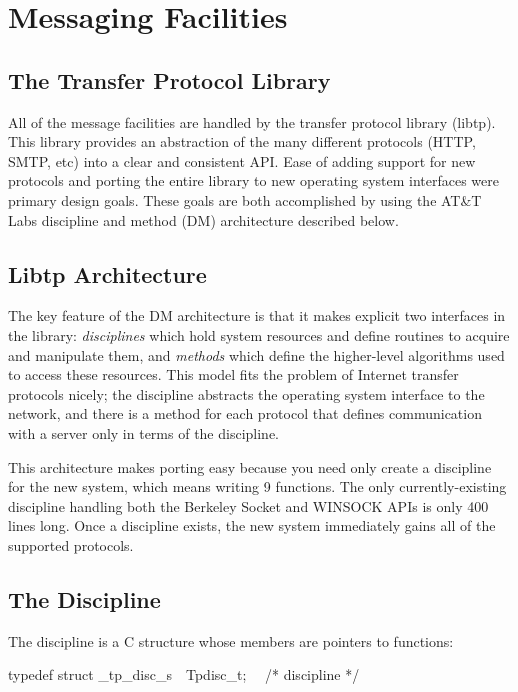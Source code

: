 \section{Messaging Facilities}
\subsection{The Transfer
Protocol Library}

All of the message facilities are handled by the transfer protocol
library (libtp). This library provides an abstraction of the many
different protocols (HTTP, SMTP, etc) into a clear and consistent
API. Ease of adding support for new protocols and porting the entire
library to new operating system interfaces were primary design
goals. These goals are both accomplished by using the AT\&T Labs
discipline and method (DM) architecture described below.

\subsection{Libtp Architecture}

The key feature of the DM architecture is that it makes explicit two
interfaces in the library: \textit{disciplines} which hold system
resources and define routines to acquire and manipulate them, and
\textit{methods} which define the higher-level algorithms used to
access these resources. This model fits the problem of Internet
transfer protocols nicely; the discipline abstracts the operating
system interface to the network, and there is a method for each
protocol that defines communication with a server only in terms of the
discipline.

This architecture makes porting easy because you need only create a
discipline for the new system, which means writing 9 functions. The
only currently-existing discipline handling both the Berkeley Socket
and WINSOCK APIs is only 400 lines long. Once a discipline exists, the
new system immediately gains all of the supported protocols.

\subsection{The Discipline}

The discipline is a C structure whose members are pointers to functions:

\bigskip

{\ttfamily\mdseries
typedef struct \_tp\_disc\_s\ \ Tpdisc\_t; \ \ /* discipline */}


